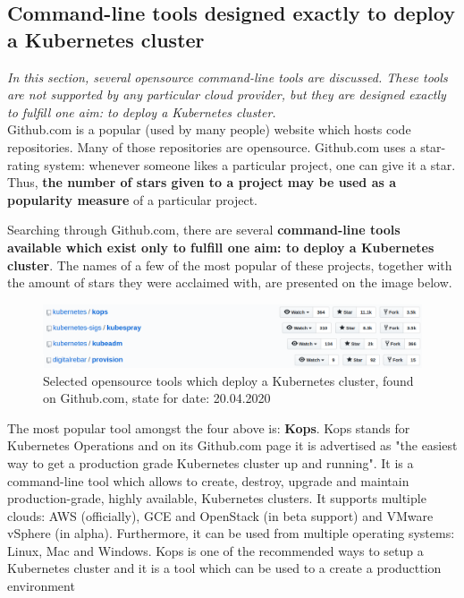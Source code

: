 \subsection{Command-line tools designed exactly to deploy a Kubernetes cluster}
\label{cli-tools-to-k8s}
\textit{In this section, several opensource command-line tools are discussed. These tools are not supported by any particular cloud provider, but they are designed exactly to fulfill one aim: to deploy a Kubernetes cluster.}
\\

Github.com is a popular (used by many people) website which hosts code repositories. Many of those repositories are opensource.  Github.com uses a star-rating system: whenever someone likes a particular project, one can give it a star. Thus, \textbf{the number of stars given to a project may be used as a popularity measure} of a particular project.

Searching through Github.com, there are several \textbf{command-line tools available which exist only to fulfill one aim: to deploy a Kubernetes cluster}. The names of a few of the most popular of these projects, together with the amount of stars they were acclaimed with, are presented on the image below.

\begin{figure}[H]
    \centering
    \includegraphics[width=17cm]{figures/custom-tools.png}
    \captionsetup{justification=centering,margin=2cm}
    \caption{Selected opensource tools which deploy a Kubernetes cluster, found on Github.com, state for date: 20.04.2020}
\end{figure}

The most popular tool amongst the four above is: \textbf{Kops}. Kops stands for Kubernetes Operations and on its Github.com page it is advertised as "the easiest way to get a production grade Kubernetes cluster up and running"\cite{online-kops-gh}. It is a command-line tool which allows to create, destroy, upgrade and maintain production-grade, highly available, Kubernetes clusters. It supports multiple clouds: AWS (officially), GCE and OpenStack (in beta support) and VMware vSphere (in alpha)\cite{online-kops-gh}. Furthermore, it can be used from multiple operating systems: Linux, Mac and Windows\cite{online-kops-install}. Kops is one of the recommended ways to setup a Kubernetes cluster and it is a tool which can be used to a create a producttion environment\cite{book-devops-with-k8s}

